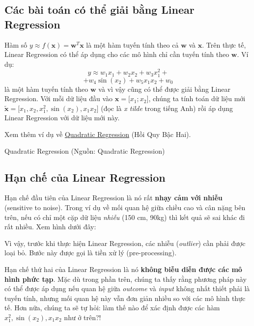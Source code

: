 \subsection{Các bài toán có thể giải bằng Linear
Regression}\label{cuxe1c-buxe0i-touxe1n-cuxf3-thux1ec3-giux1ea3i-bux1eb1ng-linear-regression}

Hàm số $y \approx f(\mathbf{x})=
\mathbf{w}^T\mathbf{x}$ là một hàm tuyến tính theo cả
$ \mathbf{w}$ và
$\mathbf{x}$. Trên thực tế, Linear
Regression có thể áp dụng cho các mô hình chỉ cần tuyến tính theo
$\mathbf{w}$. Ví dụ: \begin{equation}
y \approx w_1 x_1 + w_2 x_2 + w_3 x_1^2 + \end{equation}
\begin{equation} +w_4 \sin(x_2) + w_5 x_1x_2 + w_0
\end{equation} là một hàm tuyến tính theo
$\mathbf{w}$ và vì vậy cũng có thể được
giải bằng Linear Regression. Với mỗi dữ liệu đầu vào
$\mathbf{x}={[}x_1; x_2{]} $, chúng ta
tính toán dữ liệu mới $\tilde{\mathbf{x}} = {[}x_1,
x_2, x_1^2, \sin(x_2), x_1x_2{]}$ (đọc là
\emph{x tilde} trong tiếng Anh) rồi áp dụng Linear Regression với dữ
liệu mới này.

Xem thêm ví dụ về
\href{http://www.varsitytutors.com/hotmath/hotmath_help/topics/quadratic-regression}{Quadratic
Regression} (Hồi Quy Bậc Hai).

Quadratic Regression (Nguồn: Quadratic Regression)

\subsection{Hạn chế của Linear
Regression}\label{hux1ea1n-chux1ebf-cux1ee7a-linear-regression}

Hạn chế đầu tiên của Linear Regression là nó rất \textbf{nhạy cảm với
nhiễu} (sensitive to noise). Trong ví dụ về mối quan hệ giữa chiều cao
và cân nặng bên trên, nếu có chỉ một cặp dữ liệu \emph{nhiễu} (150 cm,
90kg) thì kết quả sẽ sai khác đi rất nhiều. Xem hình dưới đây:

Vì vậy, trước khi thực hiện Linear Regression, các nhiễu
(\emph{outlier}) cần phải được loại bỏ. Bước này được gọi là tiền xử lý
(pre-processing).

Hạn chế thứ hai của Linear Regression là nó \textbf{không biễu diễn được
các mô hình phức tạp}. Mặc dù trong phần trên, chúng ta thấy rằng phương
pháp này có thể được áp dụng nếu quan hệ giữa \emph{outcome} và
\emph{input} không nhất thiết phải là tuyến tính, nhưng mối quan hệ này
vẫn đơn giản nhiều so với các mô hình thực tế. Hơn nữa, chúng ta sẽ tự
hỏi: làm thế nào để xác định được các hàm $x_1^2,
\sin(x_2), x_1x_2$ như ở trên?!

